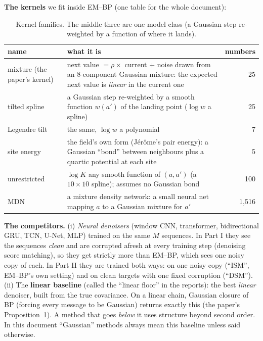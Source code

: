 \documentclass[11pt,a4paper]{article}
\begin{document}
\textbf{The kernels} we fit inside EM--BP (one table for the whole document):

\begin{table}[!htbp]\centering\small
\caption{Kernel families. The middle three are one model class (a Gaussian step re-weighted by a function of where it lands).}
\label{tab:kernels}
\begin{tabularx}{\textwidth}{@{}l L r@{}}
\toprule
name & what it is & numbers \\
\midrule
mixture (the paper's kernel) & next value $=\rho\times$ current $+$ noise drawn from an 8-component Gaussian mixture: the expected next value is \emph{linear} in the current one & 25 \\
tilted spline & a Gaussian step re-weighted by a smooth function $w(a')$ of the landing point ($\log w$ a spline) & 25 \\
Legendre tilt & the same, $\log w$ a polynomial & 7 \\
site energy & the field's own form (Jérôme's pair energy): a Gaussian ``bond'' between neighbours plus a quartic potential at each site & 5 \\
unrestricted & $\log K$ any smooth function of $(a,a')$ (a $10\times10$ spline); assumes no Gaussian bond & 100 \\
MDN & a mixture density network: a small neural net mapping $a$ to a Gaussian mixture for $a'$ & 1{,}516 \\
\bottomrule
\end{tabularx}
\end{table}

\textbf{The competitors.} (i) \emph{Neural denoisers} (window CNN, transformer, bidirectional GRU, TCN, U-Net, MLP) trained on the
same $M$ sequences. In Part I they see the sequences \emph{clean} and are corrupted afresh at every training step (denoising score
matching), so they get strictly more than EM--BP, which sees one noisy copy of each. In Part II they are trained both ways: on one
noisy copy (``ISM'', EM--BP's own setting) and on clean targets with one fixed corruption (``DSM''). (ii) The \textbf{linear baseline} (called the ``linear floor'' in the reports): the best \emph{linear} denoiser,
built from the true covariance. On a linear chain, Gaussian closure of BP (forcing every message to be Gaussian) returns exactly
this (the paper's Proposition~1). A method that goes \emph{below} it uses structure beyond second order. In this document
``Gaussian'' methods always mean this baseline unless said otherwise.
\end{document}
